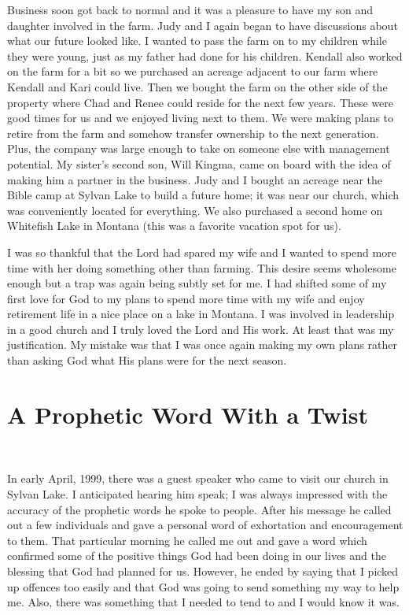 \documentclass[oneside]{book}
\begin{document}
Business soon got back to normal and it was a pleasure to have my son and daughter involved  in the farm. Judy and I again began to have discussions about what our future looked like. I wanted to pass the farm on to my children while they were young, just as my father had done for his children. Kendall also worked on the farm for a bit so we purchased an acreage adjacent to our farm where Kendall and Kari could live. Then we bought the farm on the other side of the property where Chad and Renee could reside for the next few years. These were good times for us and we enjoyed living next to them. We were making plans to retire from the farm and somehow transfer ownership to the next generation. Plus, the company was large enough to take on someone else with management potential. My sister's second son, Will Kingma, came on board with the idea of making him a partner in the business. Judy and I bought an acreage near the Bible camp at Sylvan Lake to build a future home; it was near our church, which was conveniently located for everything. We also purchased a second home on Whitefish Lake in Montana (this was a favorite vacation spot for us).

I was so thankful that the Lord had spared my wife and I wanted to spend more time with her doing something other than farming. This desire seems wholesome enough but a trap was again being subtly set for me. I had shifted some of my first love for God to my plans to spend more time with my wife and enjoy retirement life in a nice place on a lake in Montana. I was involved in leadership in a good church and I truly loved the Lord and His work. At least that was my justification. My mistake was that I was once again making my own plans rather than asking God what His plans were for the next season.


\section{A Prophetic Word With a Twist}
\

In early April, 1999, there was a guest speaker who came to visit our church in Sylvan Lake. I anticipated hearing him speak; I was always impressed with the accuracy of the prophetic words he spoke to people. After his message he called out a few individuals and gave a personal word of exhortation and encouragement to them. That particular morning he called me out and gave a word which confirmed some of the positive things God had been doing in our lives and the blessing that God had planned for us. However, he ended by saying that I picked up offences too easily and that God was going to send something my way to help me. Also, there was something that I needed to tend to and I would know it was.
 
\end{document}
